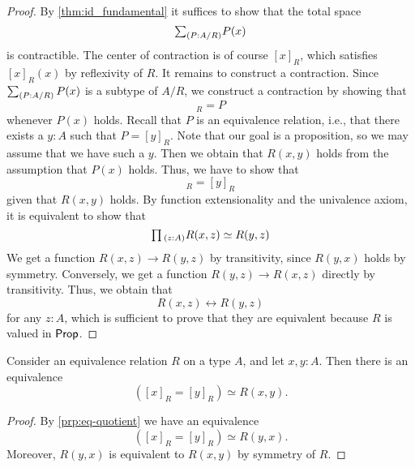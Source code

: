 \begin{proof}
  By \cref{thm:id_fundamental} it suffices to show that the total space
  \begin{equation*}
    \sm{P:A/R}P(x)
  \end{equation*}
  is contractible. The center of contraction is of course $[x]_R$, which satisfies $[x]_R(x)$ by reflexivity of $R$. It remains to construct a contraction. Since $\sm{P:A/R}P(x)$ is a subtype of $A/R$, we construct a contraction by showing that
  \begin{equation*}
    [x]_R=P
  \end{equation*}
  whenever $P(x)$ holds. Recall that $P$ is an equivalence relation, i.e., that there exists a $y:A$ such that $P=[y]_R$. Note that our goal is a proposition, so we may assume that we have such a $y$. Then we obtain that $R(x,y)$ holds from the assumption that $P(x)$ holds. Thus, we have to show that
  \begin{equation*}
    [x]_R=[y]_R
  \end{equation*}
  given that $R(x,y)$ holds. By function extensionality and the univalence axiom, it is equivalent to show that
  \begin{equation*}
    \prd{z:A}R(x,z)\simeq R(y,z)
  \end{equation*}
  We get a function $R(x,z)\to R(y,z)$ by transitivity, since $R(y,x)$ holds by symmetry. Conversely, we get a function $R(y,z)\to R(x,z)$ directly by transitivity. Thus, we obtain that
  \begin{equation*}
    R(x,z)\leftrightarrow R(y,z)
  \end{equation*}
  for any $z:A$, which is sufficient to prove that they are equivalent because $R$ is valued in $\mathsf{Prop}$.
\end{proof}

\begin{cor}\label{cor:eq-quotient}
  Consider an equivalence relation $R$ on a type $A$, and let $x,y:A$. Then there is an equivalence
  \begin{equation*}
    ([x]_R=[y]_R)\simeq R(x,y).
  \end{equation*}
\end{cor}

\begin{proof}
  By \cref{prp:eq-quotient} we have an equivalence
  \begin{equation*}
    ([x]_R=[y]_R)\simeq R(y,x).
  \end{equation*}
  Moreover, $R(y,x)$ is equivalent to $R(x,y)$ by symmetry of $R$.
\end{proof}


